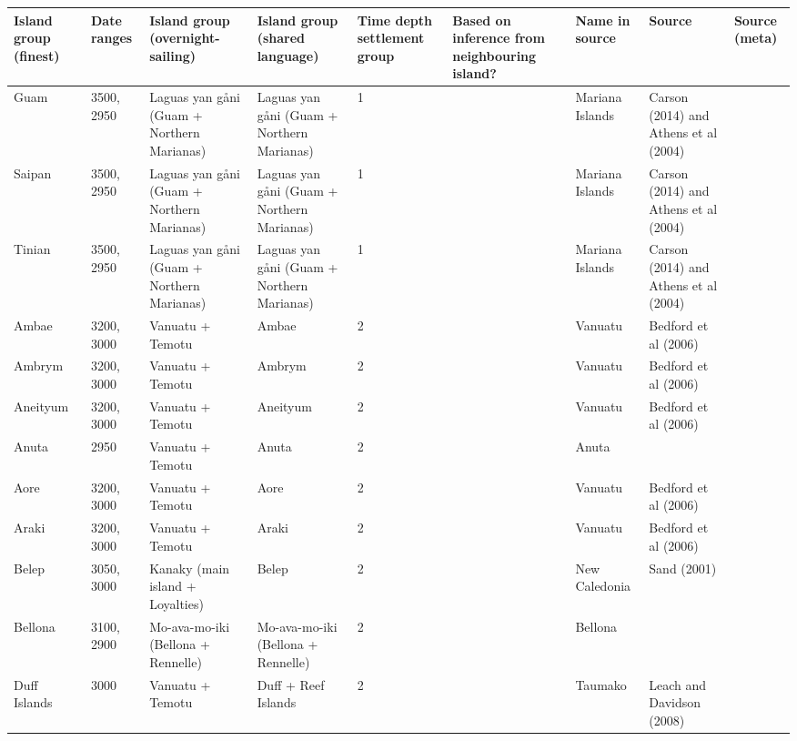 \begin{longtable}{p{2cm}p{2cm}p{2cm}p{2cm}p{2cm}p{2cm}p{2cm}p{2cm}p{2cm}}
  \toprule
Island group (finest) & Date ranges & Island group (overnight-sailing) & Island group (shared language) & Time depth settlement group & Based on inference from neighbouring island? & Name in source & Source & Source (meta) \\ 
  \midrule
Guam & 3500, 2950 & Laguas yan gåni (Guam + Northern Marianas) & Laguas yan gåni (Guam + Northern Marianas) & 1 &  & Mariana Islands & Carson (2014) and Athens et al (2004) & \citet{rieth_cochrane_2018} \\ 
  Saipan & 3500, 2950 & Laguas yan gåni (Guam + Northern Marianas) & Laguas yan gåni (Guam + Northern Marianas) & 1 &  & Mariana Islands & Carson (2014) and Athens et al (2004) & \citet{rieth_cochrane_2018} \\ 
  Tinian & 3500, 2950 & Laguas yan gåni (Guam + Northern Marianas) & Laguas yan gåni (Guam + Northern Marianas) & 1 &  & Mariana Islands & Carson (2014) and Athens et al (2004) & \citet{rieth_cochrane_2018} \\ 
  Ambae & 3200, 3000 & Vanuatu + Temotu & Ambae & 2 &  & Vanuatu & Bedford et al (2006) & \citet{rieth_cochrane_2018} \\ 
  Ambrym & 3200, 3000 & Vanuatu + Temotu & Ambrym & 2 &  & Vanuatu & Bedford et al (2006) & \citet{rieth_cochrane_2018} \\ 
  Aneityum & 3200, 3000 & Vanuatu + Temotu & Aneityum & 2 &  & Vanuatu & Bedford et al (2006) & \citet{rieth_cochrane_2018} \\ 
  Anuta & 2950 & Vanuatu + Temotu & Anuta & 2 &  & Anuta & \citet{carson2012recent} &  \\ 
  Aore & 3200, 3000 & Vanuatu + Temotu & Aore & 2 &  & Vanuatu & Bedford et al (2006) & \citet{rieth_cochrane_2018} \\ 
  Araki & 3200, 3000 & Vanuatu + Temotu & Araki & 2 &  & Vanuatu & Bedford et al (2006) & \citet{rieth_cochrane_2018} \\ 
  Belep & 3050, 3000 & Kanaky (main island + Loyalties) & Belep & 2 &  & New Caledonia & Sand (2001) & \citet{rieth_cochrane_2018} \\ 
  Bellona & 3100, 2900 & Mo-ava-mo-iki (Bellona + Rennelle) & Mo-ava-mo-iki (Bellona + Rennelle) & 2 &  & Bellona & \citet{carson2012recent} &  \\ 
  Duff Islands & 3000 & Vanuatu + Temotu & Duff + Reef Islands & 2 &  & Taumako & Leach and Davidson (2008) & \citet{carson2012recent} \\ 

\end{longtable}
